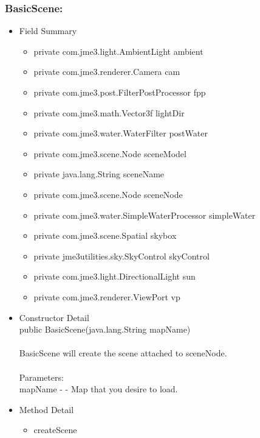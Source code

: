 \documentclass[letterpaper]{article}
\begin{document}
						\subsubsection*{BasicScene:}
						\vspace{0.1in}
							\begin{itemize}
								\item	Field Summary
										\begin{itemize}
											\item	private com.jme3.light.AmbientLight	ambient 
											\item	private com.jme3.renderer.Camera	cam 
											\item	private com.jme3.post.FilterPostProcessor	fpp 
											\item	private com.jme3.math.Vector3f	lightDir 
											\item	private com.jme3.water.WaterFilter	postWater 
											\item	private com.jme3.scene.Node	sceneModel
											\item	private java.lang.String	sceneName 
											\item	private com.jme3.scene.Node	sceneNode 
											\item	private com.jme3.water.SimpleWaterProcessor	simpleWater 
											\item	private com.jme3.scene.Spatial	skybox 
											\item	private jme3utilities.sky.SkyControl	skyControl 
											\item	private com.jme3.light.DirectionalLight	sun 
											\item	private com.jme3.renderer.ViewPort	vp 
										\end{itemize}
								\item	Constructor Detail \\
										public BasicScene(java.lang.String mapName) \\ \\
										BasicScene will create the scene attached to sceneNode. \\ \\
										Parameters: \\
										mapName - - Map that you desire to load.
								\item	Method Detail
										\begin{itemize}
											\item	createScene \\

\end{itemize}
\end{itemize}
\end{document}
